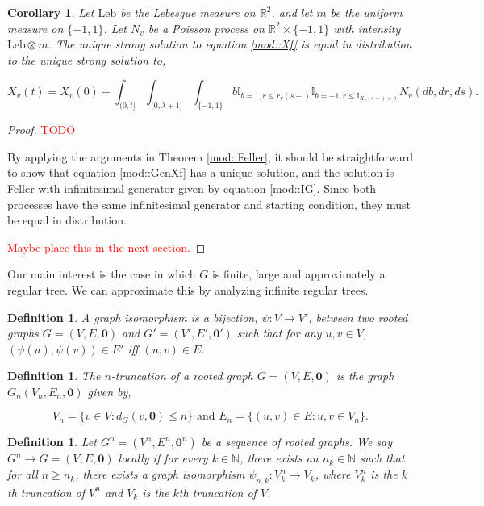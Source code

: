 \documentclass[12pt]{article}
\newcommand{\mb}{\mathbb}
\newcommand{\ra}{\rightarrow}
\newcommand{\te}{\text}
\newcommand{\tr}{\textcolor{red}}
\newcommand{\Xf}{X}									%
\newcommand{\vcomp}[1]{_{#1}}						%
\newcommand{\tme}[1]{(#1)}							%
\newcommand{\arr}{\lambda}							%
\newcommand{\poiss}{N}								%
\newcommand{\poissv}[1]{_{#1}}						%
\renewcommand{\root}{\mathbf{0}}
\newcommand{\leb}{\te{Leb}}
\newcommand{\uni}{m}
\newtheorem{coro}[thms]{Corollary}
\newtheorem{defn}[thms]{Definition}
\begin{document}
\begin{coro}
Let \(\leb\) be the Lebesgue measure on \(\mb{R}^2\), and let \(\uni\) be the uniform measure on \(\{-1,1\}\). Let \(\poiss\poissv{v}\) be a Poisson process on \(\mb{R}^2\times \{-1,1\}\) with intensity \(\leb \otimes \uni\). The unique strong solution to equation \eqref{mod::Xf} is equal in distribution to the unique strong solution to,

\begin{equation}
\Xf\vcomp{v}\tme{t} = \Xf\vcomp{v}\tme{0} + \int_{(0,t]}\int_{(0,\arr+1]} \int_{\{-1,1\}} b\mb{I}_{b=1,r \leq r\vcomp{v}\tme{s-}}\mb{I}_{b=-1,r \leq \mb{I}_{\Xf\vcomp{v}\tme{s-} > 0}}\,\poiss\poissv{v}(db,dr,ds).
\label{mod::GenXf}
\end{equation}
\label{mod::General}
\end{coro}
\begin{proof}
\tr{TODO}

By applying the arguments in Theorem \ref{mod::Feller}, it should be straightforward to show that equation \eqref{mod::GenXf} has a unique solution, and the solution is Feller with infinitesimal generator given by equation \eqref{mod::IG}. Since both processes have the same infinitesimal generator and starting condition, they must be equal in distribution.

\tr{Maybe place this in the next section.}
\end{proof}

Our main interest is the case in which \(G\) is finite, large and approximately a regular tree. We can approximate this by analyzing infinite regular trees.

\begin{defn}
A graph isomorphism is a bijection, \(\psi: V \ra V'\), between two rooted graphs \(G = (V,E,\root)\) and \(G' = (V',E',\root')\) such that for any \(u,v \in V\), \((\psi(u),\psi(v)) \in E'\) iff \((u,v) \in E\).
\label{mod::iso}
\end{defn}

\begin{defn}
The \(n\)-truncation of a rooted graph \(G = (V,E,\root)\) is the graph \(G_n(V_n,E_n,\root)\) given by,

\[V_n = \{v \in V: d_G(v,\root) \leq n\} \te{ and } E_n = \{(u,v) \in E: u,v \in V_n\}.\]
\label{mod::trunc}
\end{defn}

\begin{defn}
Let \(G^n = (V^n,E^n,\root^n)\) be a sequence of rooted graphs. We say \(G^n \ra G = (V,E,\root)\) locally if for every \(k\in \mb{N}\), there exists an \(n_k \in \mb{N}\) such that for all \(n \geq n_k\), there exists a graph isomorphism \(\psi_{n,k}: V^n_k \ra V_k\), where \(V^n_k\) is the \(k\)th truncation of \(V^n\) and \(V_k\) is the \(k\)th truncation of \(V\).
\label{mod::locconv}
\end{defn}
\end{document}
